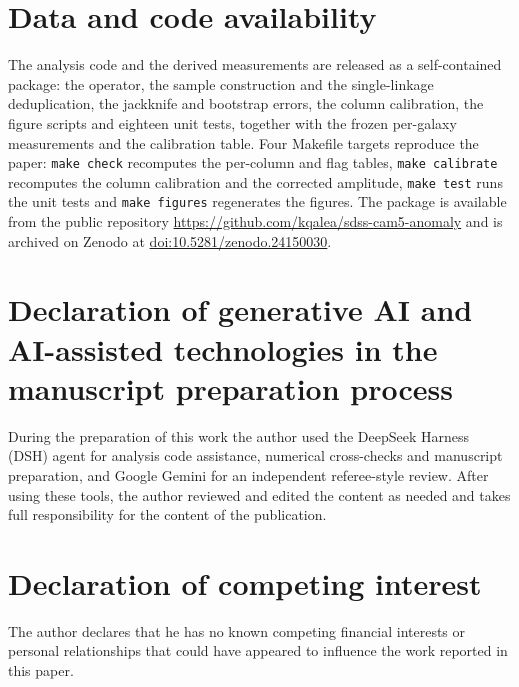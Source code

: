 \documentclass[11pt]{article}
\begin{document}
\section{Data and code availability}
The analysis code and the derived measurements are released as a self-contained package: the
operator, the sample construction and the single-linkage deduplication, the jackknife and bootstrap
errors, the column calibration, the figure scripts and eighteen unit tests, together with the frozen
per-galaxy measurements and the calibration table. Four Makefile targets reproduce the paper:
\texttt{make check} recomputes the per-column and flag tables, \texttt{make calibrate} recomputes
the column calibration and the corrected amplitude, \texttt{make test} runs the unit tests and
\texttt{make figures} regenerates the figures. The package is available from the public repository \url{https://github.com/kqalea/sdss-cam5-anomaly}
and is archived on Zenodo at \href{https://doi.org/10.5281/zenodo.24150030}{doi:10.5281/zenodo.24150030}.

\section*{Declaration of generative AI and AI-assisted technologies in the manuscript preparation process}
During the preparation of this work the author used the DeepSeek Harness (DSH) agent for analysis
code assistance, numerical cross-checks and manuscript preparation, and Google Gemini for an
independent referee-style review. After using these tools, the author reviewed and edited the
content as needed and takes full responsibility for the content of the publication.

\section*{Declaration of competing interest}
The author declares that he has no known competing financial interests or personal relationships
that could have appeared to influence the work reported in this paper.
\end{document}
